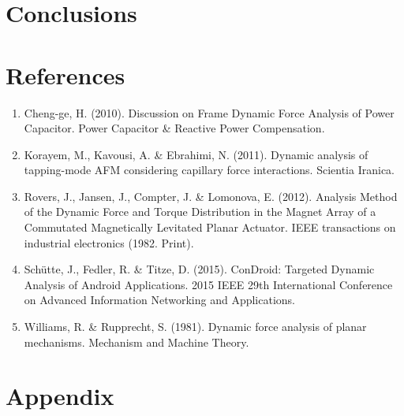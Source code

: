 \documentclass[12pt, titlepage]{article}
\begin{document}
\section{Conclusions}
\newpage
\section{References}
\begin{enumerate}
    \item \label{item:cheng2010} Cheng-ge, H. (2010). Discussion on Frame
      Dynamic Force Analysis of Power Capacitor. Power Capacitor \& Reactive
      Power Compensation.

    \item \label{item:korayem2011} Korayem, M., Kavousi, A. \& Ebrahimi, N.
    (2011). Dynamic analysis of tapping-mode AFM considering capillary force
    interactions. Scientia Iranica.

    \item \label{item:rovers2012} Rovers, J., Jansen, J., Compter, J. \&
    Lomonova, E. (2012). Analysis Method of the Dynamic Force and Torque
    Distribution in the Magnet Array of a Commutated Magnetically Levitated
    Planar Actuator. IEEE transactions on industrial electronics (1982. Print).

    \item \label{item:shutte2015} Schütte, J., Fedler, R. \& Titze, D. (2015).
    ConDroid: Targeted Dynamic Analysis of Android Applications. 2015 IEEE 29th
    International Conference on Advanced Information Networking and
    Applications.

    \item \label{item:williams1981} Williams, R. \& Rupprecht, S. (1981). Dynamic
    force analysis of planar mechanisms. Mechanism and Machine Theory.
\end{enumerate}
\newpage
\section{Appendix}
\end{document}
